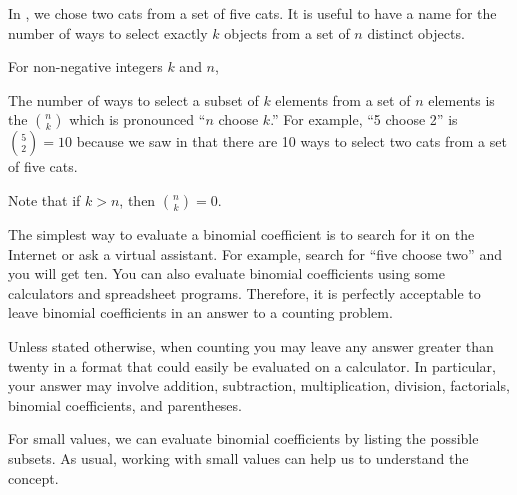 In , we chose two cats from a set of five cats. It is useful to have a name for the number of ways to select exactly $k$ objects from a set of $n$ distinct objects.  

\begin{defn} 
\label{defn_binomial_coeff}
    For non-negative integers $k$ and $n$,
    \begin{apart}
        \item The number of ways to select a subset of $k$ elements from a set of $n$ elements is the 
        $\binom{n}{k}$
        which is pronounced ``$n$ choose $k$.''  For example, ``5 choose 2'' is $\binom{5}{2} = 10$
        because we saw in  that there are 10 ways to select two cats from a set of five cats. 
        \item Note that if $k>n$, then $\binom{n}{k}=0$.
    \end{apart}
\end{defn}

The simplest way to evaluate a binomial coefficient is to search for it on the Internet or ask a virtual assistant. For example, search for ``five choose two'' and you will get ten. You can also evaluate binomial coefficients using some calculators and spreadsheet programs.
Therefore, it is perfectly acceptable to leave binomial coefficients in an answer to a counting problem.

\begin{rem} 
\label{rem_not_eval_counts_3}
Unless stated otherwise, when counting you may leave any answer greater than twenty in a format that could easily be evaluated on a calculator. In particular, your answer may involve addition, subtraction, multiplication, division, factorials, binomial coefficients, and parentheses.
\end{rem}

For small values, we can evaluate binomial coefficients by listing the possible subsets.  As usual, working with small values can help us to understand the concept.

